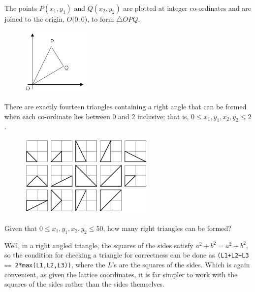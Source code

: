
The points $P (x_1, y_1)$ and $Q (x_2, y_2)$ are plotted at integer co-ordinates and are joined to the origin, $O(0,0$), to form $\triangle OPQ$.
\vspace{-0.5cm}
\begin{center}
\begin{figure}[h]
\centering
\includegraphics[width = 0.30\textwidth]{./images/p_091_1.png}
\end{figure}
\end{center}
\vspace{-1.3cm}

There are exactly fourteen triangles containing a right angle that can be formed when each co-ordinate lies between 0 and 2 inclusive; that is, $0 \leq x_1, y_1, x_2, y_2 \leq 2$.
\vspace{-0.5cm}
\begin{center}
\begin{figure}[h]
\centering
\includegraphics[width = 0.60\textwidth]{./images/p_091_2.png}
\end{figure}
\end{center}
\vspace{-1.5cm}

Given that $0 \leq x_1, y_1, x_2, y_2 \leq 50$, how many right triangles can be formed?

\vspace{-0.5cm}
Well, in a right angled triangle, the squares of the sides satisfy $a^2+b^2= a^2+b^2$, so the condition for checking a triangle for correctness can be done as \verb"(L1+L2+L3 == 2*max(L1,L2,L3))", where the $L$'s are the squares of the sides.  Which is again convenient, as given the lattice coordinates, it is far simpler to work with the squares of the sides rather than the sides themselves.

